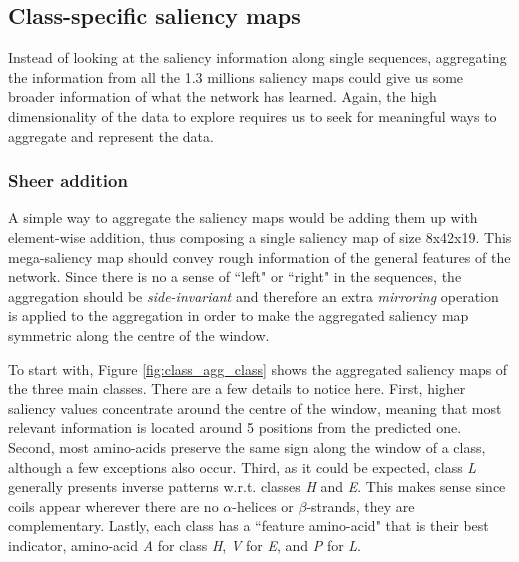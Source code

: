 	

	\subsection{Class-specific saliency maps}
	Instead of looking at the saliency information along single sequences, aggregating the information from all the 1.3 millions saliency maps could give us some broader information of what the network has learned. Again, the high dimensionality of the data to explore requires us to seek for meaningful ways to aggregate and represent the data.
	
		\subsubsection*{Sheer addition} \label{sect:sheer}
		A simple way to aggregate the saliency maps would be adding them up with element-wise addition, thus composing a single saliency map of size 8x42x19. This mega-saliency map should convey rough information of the general features of the network. Since there is no a sense of ``left" or ``right" in the sequences, the aggregation should be \textit{side-invariant} and therefore an extra \textit{mirroring} operation is applied to the aggregation in order to make the aggregated saliency map symmetric along the centre of the window.
		
		To start with, Figure \ref{fig:class_agg_class} shows the aggregated saliency maps of the three main classes. There are a few details to notice here. First, higher saliency values concentrate around the centre of the window, meaning that most relevant information is located around 5 positions from the predicted one. Second, most amino-acids preserve the same sign along the window of a class, although a few exceptions also occur. Third, as it could be expected, class \textit{L} generally presents inverse patterns w.r.t. classes \textit{H} and \textit{E}. This makes sense since coils appear wherever there are no $\alpha$-helices or $\beta$-strands, they are complementary. Lastly, each class has a ``feature amino-acid" that is their best indicator, amino-acid \textit{A} for class \textit{H}, \textit{V} for \textit{E}, and \textit{P} for \textit{L}.
		
